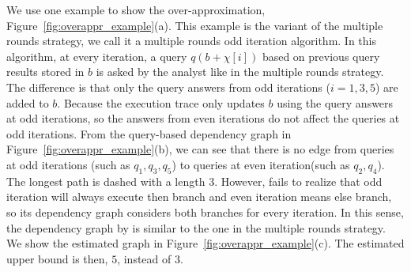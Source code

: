 We use one example to show the over-approximation, Figure~\ref{fig:overappr_example}(a). This example is the variant of the multiple rounds strategy, 
we call it a multiple rounds odd iteration algorithm. In this algorithm, at every iteration, a query $q(b+\chi[i])$ based on previous query results stored in $b$ is asked by the analyst like in the multiple rounds strategy. The difference is that only the query answers from odd iterations ($i =1,3, 5$) are added to $b$. 
  Because the execution trace only updates $b$ using the query answers at odd iterations, so the answers from even iterations do not affect the queries at odd iterations. From the query-based dependency graph in Figure~\ref{fig:overappr_example}(b), we can see that there is no edge from queries at odd iterations (such as $q_1,q_3,q_5$) to queries at even iteration(such as $q_2,q_4$). The longest path is dashed with a length $3$.  However, {\ADAPTSYSTEM} fails to realize that odd iteration will always execute then branch and even iteration means else branch, so its dependency graph considers both branches for every iteration. In this sense, the dependency graph by {\ADAPTSYSTEM} is similar to the one in the multiple rounds strategy. We show the estimated graph in Figure~\ref{fig:overappr_example}(c). The estimated upper bound is then, $5$, instead of $3$. 
%

